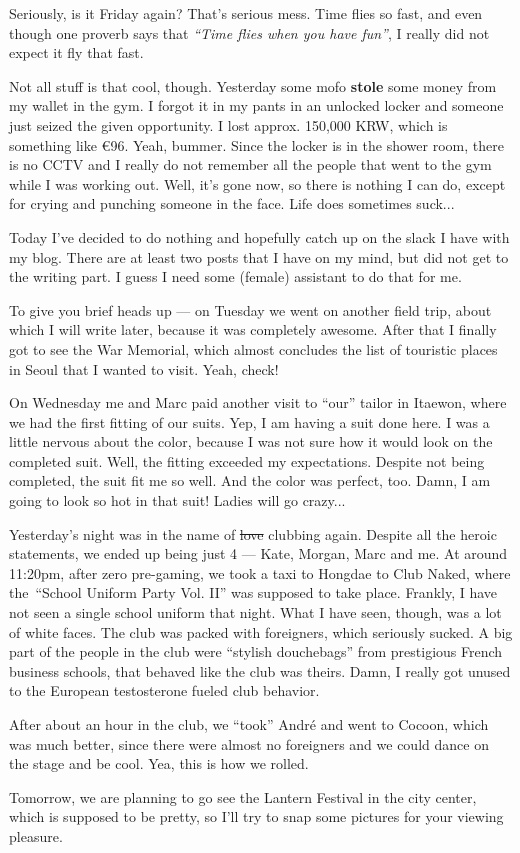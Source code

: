 \begin{post}
	\begin{content}
Seriously, is it Friday again? That's serious mess. Time flies so fast, and even though one proverb says that \textit{``Time flies when you have fun''}, I really did not expect it fly that fast.

Not all stuff is that cool, though. Yesterday some mofo \textbf{stole} some money from my wallet in the gym. I forgot it in my pants in an unlocked locker and someone just seized the given opportunity. I lost approx. 150,000 KRW, which is something like €96. Yeah, bummer. Since the locker is in the shower room, there is no CCTV and I really do not remember all the people that went to the gym while I was working out. Well, it's gone now, so there is nothing I can do, except for crying and punching someone in the face. Life does sometimes suck...

Today I've decided to do nothing and hopefully catch up on the slack I have with my blog. There are at least two posts that I have on my mind, but did not get to the writing part. I guess I need some (female) assistant to do that for me.

To give you brief heads up — on Tuesday we went on another field trip, about which I will write later, because it was completely awesome. After that I finally got to see the War Memorial, which almost concludes the list of touristic places in Seoul that I wanted to visit. Yeah, check!

On Wednesday me and Marc paid another visit to ``our'' tailor in Itaewon, where we had the first fitting of our suits. Yep, I am having a suit done here. I was a little nervous about the color, because I was not sure how it would look on the completed suit. Well, the fitting exceeded my expectations. Despite not being completed, the suit fit me so well. And the color was perfect, too. Damn, I am going to look so hot in that suit! Ladies will go crazy...

Yesterday's night was in the name of \sout{love} clubbing again. Despite all the heroic statements, we ended up being just 4 — Kate, Morgan, Marc and me. At around 11:20pm, after zero pre-gaming, we took a taxi to Hongdae to Club Naked, where the ``School Uniform Party Vol. II'' was supposed to take place. Frankly, I have not seen a single school uniform that night. What I have seen, though, was a lot of white faces. The club was packed with foreigners, which seriously sucked. A big part of the people in the club were ``stylish douchebags'' from prestigious French business schools, that behaved like the club was theirs. Damn, I really got unused to the European testosterone fueled club behavior.

After about an hour in the club, we ``took'' André and went to Cocoon, which was much better, since there were almost no foreigners and we could dance on the stage and be cool. Yea, this is how we rolled.

Tomorrow, we are planning to go see the Lantern Festival in the city center, which is supposed to be pretty, so I'll try to snap some pictures for your viewing pleasure.
	\end{content}
\end{post}
